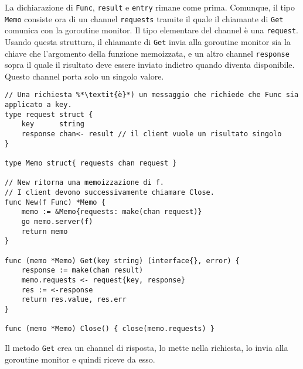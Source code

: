 \documentclass[../../thesis.tex]{subfiles}
\begin{document}
    La dichiarazione di \verb"Func", \verb"result" e \verb"entry" rimane come prima.
    Comunque, il tipo \verb"Memo" consiste ora di un channel \verb"requests" tramite il quale il chiamante di \verb"Get" comunica con la goroutine monitor.
    Il tipo elementare del channel è una \verb"request".
    Usando questa struttura, il chiamante di \verb"Get" invia alla goroutine monitor sia la chiave che l'argomento della funzione memoizzata, e un altro channel \verb"response" sopra il quale il risultato deve essere inviato indietro quando diventa disponibile.
    Questo channel porta solo un singolo valore.
    \begin{lstlisting}[frame = single,label={lst:lstlisting9-7.8}]
// Una richiesta %*\textit{è}*) un messaggio che richiede che Func sia applicato a key.
type request struct {
    key      string
    response chan<- result // il client vuole un risultato singolo
}

type Memo struct{ requests chan request }

// New ritorna una memoizzazione di f.
// I client devono successivamente chiamare Close.
func New(f Func) *Memo {
    memo := &Memo{requests: make(chan request)}
    go memo.server(f)
    return memo
}

func (memo *Memo) Get(key string) (interface{}, error) {
    response := make(chan result)
    memo.requests <- request{key, response}
    res := <-response
    return res.value, res.err
}

func (memo *Memo) Close() { close(memo.requests) }
    \end{lstlisting}
    Il metodo \verb"Get" crea un channel di risposta, lo mette nella richiesta, lo invia alla goroutine monitor e quindi riceve da esso.
    \hfill \vspace{12pt}
\end{document}
